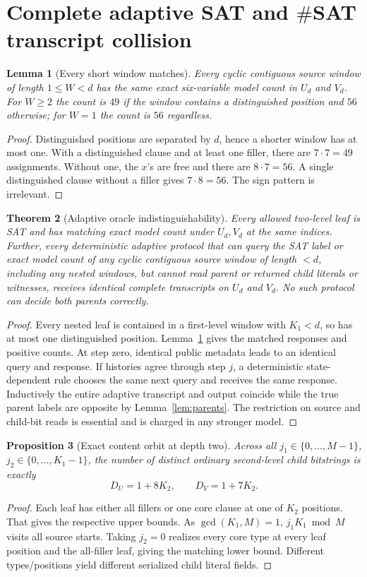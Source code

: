 \documentclass[11pt]{article}
\newtheorem{theorem}{Theorem}
\newtheorem{lemma}[theorem]{Lemma}
\newtheorem{proposition}[theorem]{Proposition}
\begin{document}
\section{Complete adaptive SAT and \(\#\)SAT transcript collision}
\begin{lemma}[Every short window matches]\label{lem:window}
Every cyclic contiguous source window of length \(1\le W<d\) has the same exact six-variable model count in \(U_d\) and \(V_d\). For \(W\ge2\) the count is \(49\) if the window contains a distinguished position and \(56\) otherwise; for \(W=1\) the count is \(56\) regardless.
\end{lemma}
\begin{proof}
Distinguished positions are separated by \(d\), hence a shorter window has at most one. With a distinguished clause and at least one filler, there are \(7\cdot7=49\) assignments. Without one, the \(x\)'s are free and there are \(8\cdot7=56\). A single distinguished clause without a filler gives \(7\cdot8=56\). The sign pattern is irrelevant.
\end{proof}
\begin{theorem}[Adaptive oracle indistinguishability]\label{thm:adaptive}
Every allowed two-level leaf is SAT and has matching exact model count under \(U_d,V_d\) at the same indices. Further, \emph{every deterministic adaptive protocol} that can query the SAT label or exact model count of \emph{any} cyclic contiguous source window of length \(<d\), including any nested windows, but cannot read parent or returned child literals or witnesses, receives identical complete transcripts on \(U_d\) and \(V_d\). No such protocol can decide both parents correctly.
\end{theorem}
\begin{proof}
Every nested leaf is contained in a first-level window with \(K_1<d\), so has at most one distinguished position. Lemma~\ref{lem:window} gives the matched responses and positive counts. At step zero, identical public metadata leads to an identical query and response. If histories agree through step \(j\), a deterministic state-dependent rule chooses the same next query and receives the same response. Inductively the entire adaptive transcript and output coincide while the true parent labels are opposite by Lemma~\ref{lem:parents}. The restriction on source and child-bit reads is essential and is charged in any stronger model.
\end{proof}
\begin{proposition}[Exact content orbit at depth two]\label{prop:orbit}
Across all \(j_1\in\{0,\ldots,M-1\}\), \(j_2\in\{0,\ldots,K_1-1\}\), the number of distinct ordinary second-level child bitstrings is exactly
\[
D_U=1+8K_2,\qquad D_V=1+7K_2.
\]
\end{proposition}
\begin{proof}
Each leaf has either all fillers or one core clause at one of \(K_2\) positions. That gives the respective upper bounds. As \(\gcd(K_1,M)=1\), \(j_1K_1\bmod M\) visits all source starts. Taking \(j_2=0\) realizes every core type at every leaf position and the all-filler leaf, giving the matching lower bound. Different types/positions yield different serialized child literal fields.
\end{proof}
\end{document}
